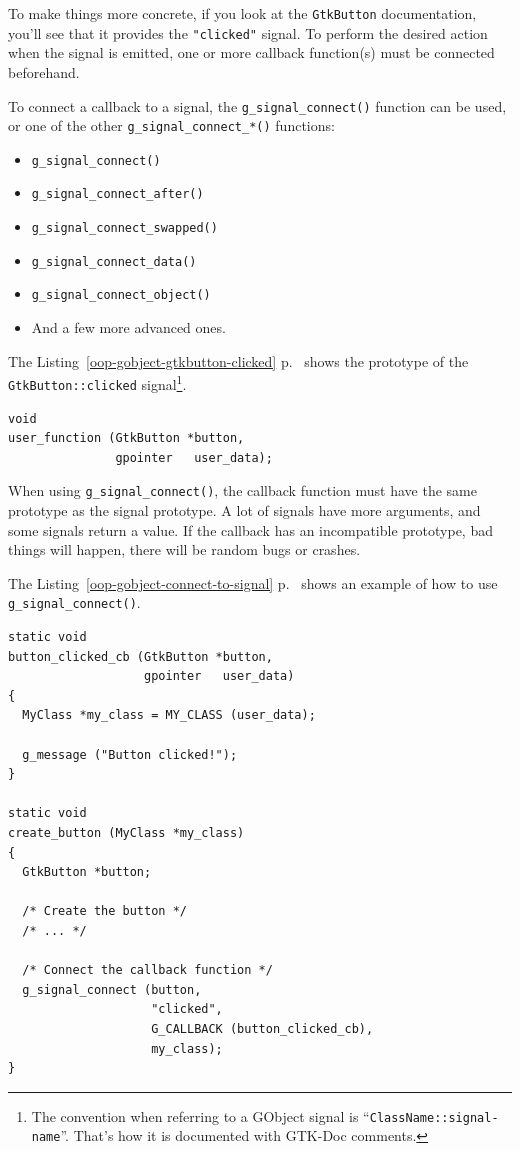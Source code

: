 To make things more concrete, if you look at the \lstinline{GtkButton} documentation, you'll see that it provides the \lstinline{"clicked"} signal. To perform the desired action when the signal is emitted, one or more callback function(s) must be connected beforehand.

To connect a callback to a signal, the \lstinline{g_signal_connect()} function can be used, or one of the other \lstinline{g_signal_connect_*()} functions:
\begin{itemize}
  \item \lstinline{g_signal_connect()}
  \item \lstinline{g_signal_connect_after()}
  \item \lstinline{g_signal_connect_swapped()}
  \item \lstinline{g_signal_connect_data()}
  \item \lstinline{g_signal_connect_object()}
  \item And a few more advanced ones.
\end{itemize}

The Listing~\ref{oop-gobject-gtkbutton-clicked} p.~\pageref{oop-gobject-gtkbutton-clicked} shows the prototype of the \lstinline{GtkButton::clicked} signal\footnote{The convention when referring to a GObject signal is ``\lstinline{ClassName::signal-name}''. That's how it is documented with GTK-Doc comments.}.

\begin{lstlisting}[float, caption={The prototype of the \lstinline{GtkButton::clicked} signal.}, label=oop-gobject-gtkbutton-clicked]
void
user_function (GtkButton *button,
               gpointer   user_data);
\end{lstlisting}

When using \lstinline{g_signal_connect()}, the callback function must have the same prototype as the signal prototype. A lot of signals have more arguments, and some signals return a value. If the callback has an incompatible prototype, bad things will happen, there will be random bugs or crashes.

The Listing~\ref{oop-gobject-connect-to-signal} p.~\pageref{oop-gobject-connect-to-signal} shows an example of how to use \lstinline{g_signal_connect()}.

\begin{lstlisting}[float, caption={How to connect to a signal}, label=oop-gobject-connect-to-signal]
static void
button_clicked_cb (GtkButton *button,
                   gpointer   user_data)
{
  MyClass *my_class = MY_CLASS (user_data);

  g_message ("Button clicked!");
}

static void
create_button (MyClass *my_class)
{
  GtkButton *button;

  /* Create the button */
  /* ... */

  /* Connect the callback function */
  g_signal_connect (button,
                    "clicked",
                    G_CALLBACK (button_clicked_cb),
                    my_class);
}
\end{lstlisting}

